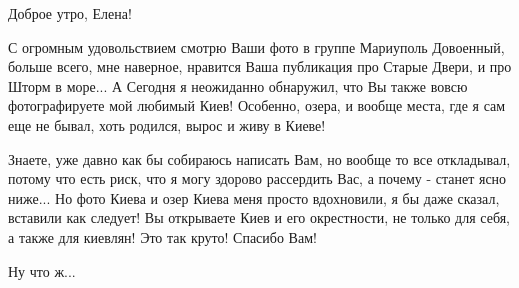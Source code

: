  
 
 
 
 

Доброе утро, Елена! 

С огромным удовольствием смотрю Ваши фото в группе Мариуполь Довоенный, больше всего, мне 
наверное, нравится Ваша публикация про Старые Двери, и про Шторм в море...
А Сегодня я неожиданно обнаружил, что Вы также вовсю фотографируете мой любимый Киев!
Особенно, озера, и вообще места, где я сам еще не бывал, хоть родился, вырос и живу в Киеве!

Знаете, уже давно как бы собираюсь написать Вам, но вообще то все откладывал,
потому что есть риск, что я могу здорово рассердить Вас, а почему - станет ясно ниже...
Но фото Киева и озер Киева меня просто вдохновили, я бы даже сказал, вставили как следует! 
Вы открываете Киев и его окрестности, не только для себя,
а также для киевлян! Это так круто! Спасибо Вам!

Ну что ж...

